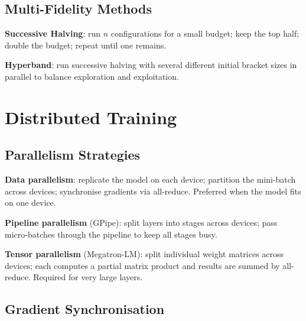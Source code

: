 \documentclass[oneside]{book}
\begin{document}

\section{Multi-Fidelity Methods}

\textbf{Successive Halving}: run $n$ configurations for a small budget;
keep the top half; double the budget; repeat until one remains.

\textbf{Hyperband}: run successive halving with several different initial
bracket sizes in parallel to balance exploration and exploitation.

\chapter{Distributed Training}

\section{Parallelism Strategies}

\textbf{Data parallelism}: replicate the model on each device; partition
the mini-batch across devices; synchronise gradients via all-reduce.
Preferred when the model fits on one device.

\textbf{Pipeline parallelism} (GPipe): split layers into stages across
devices; pass micro-batches through the pipeline to keep all stages busy.

\textbf{Tensor parallelism} (Megatron-LM): split individual weight matrices
across devices; each computes a partial matrix product and results are
summed by all-reduce.  Required for very large layers.

\section{Gradient Synchronisation}
\end{document}
